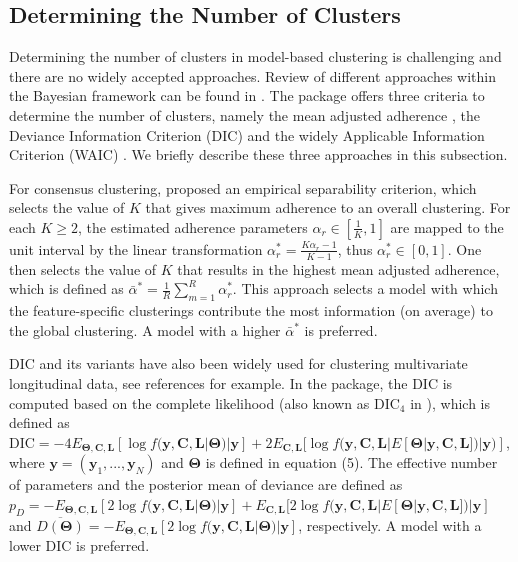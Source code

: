 \subsection{Determining the Number of Clusters}
Determining the number of clusters in model-based clustering is challenging and there are no widely accepted approaches. Review of different approaches within the Bayesian framework can be found in \citet{Celeux2006, Nasserinejad2017,Merkle2019}. The  package offers three criteria to determine the number of clusters, namely the mean adjusted adherence \citep{Lock2013}, the Deviance Information Criterion (DIC) \citep{Spiegelhalter2002, Celeux2006} and the widely Applicable Information Criterion (WAIC) \citep{Watanabe2010, Gelman2014a}. We briefly describe these three approaches in this subsection. 

For consensus clustering, \citet{Lock2013} proposed an empirical separability criterion, which selects the value of $K$ that gives maximum adherence to an overall clustering.  For each $K \ge 2$, the estimated adherence parameters $\alpha_r \in [\frac{1}{K},1]$ are mapped to the unit interval by the linear transformation  $\alpha^{*}_r = \frac{K\alpha_r - 1}{K-1}$, thus $\alpha^{*}_r \in [0,1]$. One then selects the value of $K$ that results in the highest mean adjusted adherence, which is defined as $ \bar{\alpha}^{*} = \frac{1}{R}\sum_{m=1}^R \alpha^{*}_r$.  This approach selects a model with which the feature-specific clusterings contribute the most information (on average) to the global clustering. A model with a higher $\bar{\alpha}^{*}$ is preferred.

DIC and its variants have also been widely used for clustering multivariate longitudinal data, see references \citep{Lu2019, Neelon2011, Leiby2009,Elliott2005,Fruehwirth-Schnatter2010} for example. In the  package,  the DIC is computed based on the complete likelihood  (also known as $\text{DIC}_4$ in \citet{Celeux2006}), which is defined as
$ \text{DIC} = -4E_{\boldsymbol{\Theta},\boldsymbol{C},\boldsymbol{L}} [\log f(\boldsymbol{y},\boldsymbol{C},\boldsymbol{L}|\boldsymbol{\Theta})|\boldsymbol{y}]+ 2E_{\boldsymbol{C},\boldsymbol{L}}[\log f(\boldsymbol{y},\boldsymbol{C},\boldsymbol{L}|E[\boldsymbol{\Theta}|\boldsymbol{y},\boldsymbol{C},\boldsymbol{L}])|\boldsymbol{y})] $, where $\boldsymbol{y} = (\boldsymbol{y}_1, ..., \boldsymbol{y}_N)$ and $\boldsymbol{\Theta}$ is defined in equation (5). The effective number of parameters and the posterior mean of deviance are defined as $p_D = - E_{\boldsymbol{\Theta},\boldsymbol{C},\boldsymbol{L}}[2\log f(\boldsymbol{y},\boldsymbol{C},\boldsymbol{L}|\boldsymbol{\Theta})|\boldsymbol{y}] +  E_{\boldsymbol{C},\boldsymbol{L}}[2\log f(\boldsymbol{y},\boldsymbol{C},\boldsymbol{L}|E[\boldsymbol{\Theta}|\boldsymbol{y},\boldsymbol{C},\boldsymbol{L}])|\boldsymbol{y}]$ and $\overline{D(\boldsymbol{\Theta})} = -E_{\boldsymbol{\Theta},\boldsymbol{C},\boldsymbol{L}}[2\log f(\boldsymbol{y},\boldsymbol{C},\boldsymbol{L}|\boldsymbol{\Theta})|\boldsymbol{y}]$, respectively. A model with a lower DIC is preferred. 

